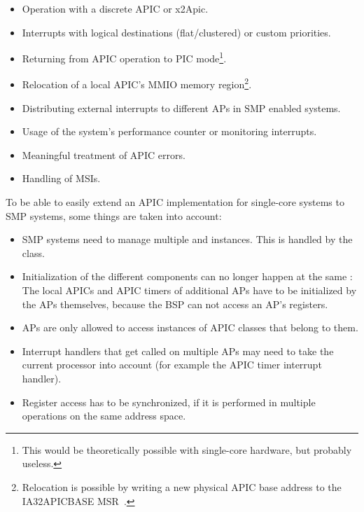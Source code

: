 \begin{itemize}
  \item Operation with a discrete APIC or x2Apic.
  \item Interrupts with logical destinations (flat/clustered) or custom priorities.
  \item Returning from APIC operation to PIC mode\footnote{
        This would be theoretically possible with single-core hardware, but probably useless.}.
  \item Relocation of a local APIC's MMIO memory region\footnote{
        Relocation is possible by writing a new physical APIC base address to the IA32\textunderscore{}APIC\textunderscore{}BASE MSR~\autocite[sec.~3.11.4.5]{ia32}.}.
  \item Distributing external interrupts to different APs in SMP enabled systems.
  \item Usage of the system's performance counter or monitoring interrupts.
  \item Meaningful treatment of APIC errors.
  \item Handling of MSIs.
\end{itemize}

To be able to easily extend an APIC implementation for single-core systems to SMP systems, some things are taken into account:

\begin{itemize}
  \item SMP systems need to manage multiple  and  instances.
        This is handled by the  class.
  \item Initialization of the different components can no longer happen at the same : The local APICs and APIC timers of additional APs have to be initialized by the APs themselves, because the BSP can not access an AP's registers.
  \item APs are only allowed to access instances of APIC classes that belong to them.
  \item Interrupt handlers that get called on multiple APs may need to take the current processor into account (for example the APIC timer interrupt handler).
  \item Register access has to be synchronized, if it is performed in multiple operations on the same address space.
\end{itemize}

